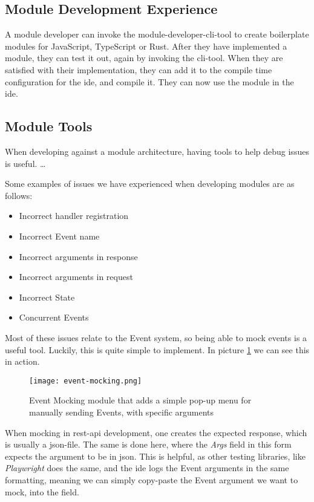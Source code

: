 \subsection{Module Development Experience}

A module developer can invoke the module-developer-\gls*{cli}-tool to create
boilerplate modules for JavaScript, TypeScript or Rust. After they have
implemented a module, they can test it out, again by invoking the
\gls*{cli}-tool. When they are satisfied with their implementation, they can add
it to the compile time configuration for the \gls*{ide}, and compile it. They
can now use the module in the \gls*{ide}.

\subsection{Module Tools}

When developing against a module architecture, having tools to help debug issues
is useful. \dots

Some examples of issues we have experienced when developing modules are as
follows:

\begin{itemize}
  \item Incorrect handler registration
  \item Incorrect Event name
  \item Incorrect arguments in response
  \item Incorrect arguments in request
  \item Incorrect State
  \item Concurrent Events
\end{itemize}

Most of these issues relate to the Event system, so being able to mock events
is a useful tool. Luckily, this is quite simple to implement. In
picture \ref{pic:eventMock} we can see this in action.

\begin{figure}[H]
  \centering
  \texttt{[image: event-mocking.png]}
  \caption{
    Event Mocking module that adds a simple pop-up menu for manually sending
    Events, with specific arguments
  }
  \label{pic:eventMock}
\end{figure}

When mocking in \gls*{rest}-\gls*{api} development, one creates the expected
response, which is usually a \gls*{json}-file. The same is done here, where the
\textit{Args} field in this form expects the argument to be in \gls*{json}. This
is helpful, as other testing libraries, like \textit{Playwright} does the same,
and the \gls*{ide} logs the Event arguments in the same formatting, meaning we
can simply copy-paste the Event argument we want to mock, into the field.

